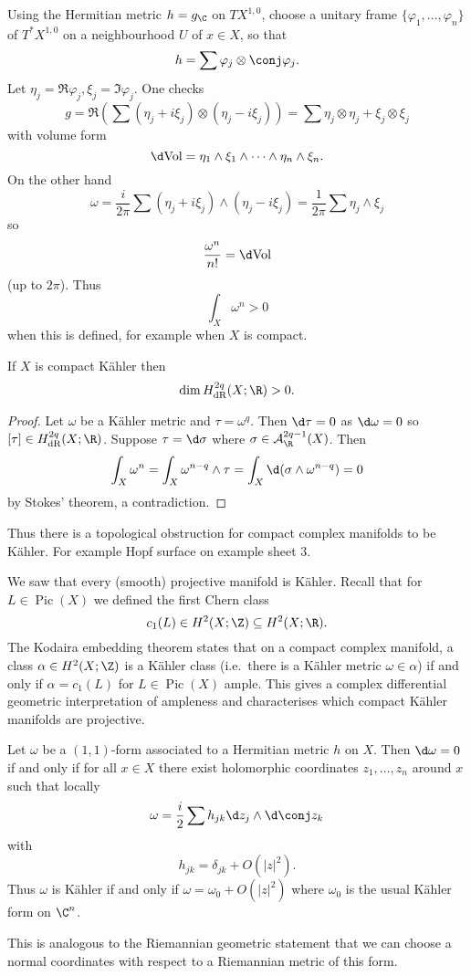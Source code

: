\documentclass[a4paper]{article}
\newcommand{\w}{\wedge} %
\DeclareMathOperator{\Pic}{Pic} %
\begin{document}
Using the Hermitian metric \(h = g_\C\) on \(TX^{1, 0}\), choose a unitary frame \(\{\varphi_1, \dots, \varphi_n\}\) of \(T^*X^{1, 0}\) on a neighbourhood \(U\) of \(x \in X\), so that
\[
  h = \sum \varphi_j \otimes \conj \varphi_j.
\]
Let \(\eta_j = \Re \varphi_j, \xi_j = \Im \varphi_j\). One checks
\[
  g
  = \Re (\sum (\eta_j + i \xi_j) \otimes (\eta_j - i \xi_j))
  = \sum \eta_j \otimes \eta_j + \xi_j \otimes \xi_j
\]
with volume form
\[
  \d \text{Vol} = \eta_1 \w \xi_1 \w \cdots \w \eta_n \w \xi_n.
\]
On the other hand
\[
  \omega
  = \frac{i}{2\pi} \sum (\eta_j + i \xi_j) \w (\eta_j - i \xi_j)
  = \frac{1}{2\pi} \sum \eta_j \w \xi_j
\]
so
\[
  \frac{\omega^n}{n!} = \d \text{Vol}
\]
(up to \(2\pi\)). Thus
\[
  \int_X \omega^n > 0
\]
when this is defined, for example when \(X\) is compact.

\begin{proposition}
  If \(X\) is compact Kähler then
  \[
    \dim H^{2q}_{\text{dR}} (X; \R) > 0.
  \]
\end{proposition}

\begin{proof}
  Let \(\omega\) be a Kähler metric and \(\tau = \omega^q\). Then \(\d \tau = 0\) as \(\d \omega = 0\) so \([\tau] \in H^{2q}_{\text{dR}} (X; \R)\). Suppose \(\tau = \d \sigma\) where \(\sigma \in \mathcal A^{2q - 1}_\R(X)\). Then
  \[
    \int_X \omega^n
    = \int_X \omega^{n - q} \w \tau
    = \int_X \d (\sigma \w \omega^{n - q})
    = 0
  \]
  by Stokes' theorem, a contradiction.
\end{proof}

Thus there is a topological obstruction for compact complex manifolds to be Kähler. For example Hopf surface on example sheet 3.

\begin{remark}
  We saw that every (smooth) projective manifold is Kähler. Recall that for \(L \in \Pic(X)\) we defined the first Chern class
  \[
    c_1(L) \in H^2(X; \Z) \subseteq H^2(X; \R).
  \]
  The Kodaira embedding theorem states that on a compact complex manifold, a class \(\alpha \in H^2(X; \Z)\) is a Kähler class (i.e.\ there is a Kähler metric \(\omega \in \alpha\)) if and only if \(\alpha = c_1(L)\) for \(L \in \Pic(X)\) ample. This gives a complex differential geometric interpretation of ampleness and characterises which compact Kähler manifolds are projective.
\end{remark}

\begin{proposition}
  Let \(\omega\) be a \((1, 1)\)-form associated to a Hermitian metric \(h\) on \(X\). Then \(\d \omega = 0\) if and only if for all \(x \in X\) there exist holomorphic coordinates \(z_1, \dots, z_n\) around \(x\) such that locally
  \[
    \omega = \frac{i}{2} \sum h_{jk} \d z_j \w \d \conj z_k
  \]
  with
  \[
    h_{jk} = \delta_{jk} + O(|z|^2).
  \]
  Thus \(\omega\) is Kähler if and only if \(\omega = \omega_0 + O(|z|^2)\) where \(\omega_0\) is the usual Kähler form on \(\C^n\).
\end{proposition}
This is analogous to the Riemannian geometric statement that we can choose a normal coordinates with respect to a Riemannian metric of this form.
\end{document}
